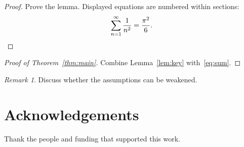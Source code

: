 \documentclass{amsart}
\theoremstyle{definition}
\theoremstyle{remark}
\newtheorem{remark}[theorem]{Remark}
\numberwithin{equation}{section}
\begin{document}
\begin{proof}
Prove the lemma. Displayed equations are numbered within sections:
\begin{equation}\label{eq:sum}
  \sum_{n=1}^{\infty} \frac{1}{n^2} = \frac{\pi^2}{6}. \qedhere
\end{equation}
\end{proof}

\begin{proof}[Proof of Theorem~\ref{thm:main}]
Combine Lemma~\ref{lem:key} with~\eqref{eq:sum}.
\end{proof}

\begin{remark}
Discuss whether the assumptions can be weakened.
\end{remark}

\section*{Acknowledgements}
Thank the people and funding that supported this work.



\end{document}
